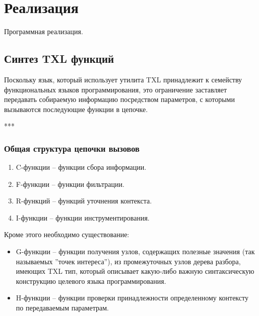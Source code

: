 \chapter{Реализация}

Программная реализация.

\section{Синтез TXL функций}

Поскольку язык, который использует утилита TXL принадлежит к семейству функциональных языков программирования, это ограничение заставляет передавать собираемую информацию посредством параметров, с которыми вызываются последующие функции в цепочке.

***

\subsection{Общая структура цепочки вызовов}

\begin{enumerate}
  \item C-функции -- функции сбора информации.
  \item F-функции -- функции фильтрации.
  \item R-функций -- функций уточнения контекста.
  \item I-функции -- функции инструментирования.
\end{enumerate}

Кроме этого необходимо существование:
\begin{itemize}
  \item G-функции -- функции получения узлов, содержащих полезные значения (так называемых ''точек интереса''), из промежуточных узлов дерева разбора, имеющих TXL тип, который описывает какую-либо важную синтаксическую конструкцию целевого языка программирования.
  \item H-функции -- функции проверки принадлежности определенному контексту по передаваемым параметрам.
\end{itemize}

